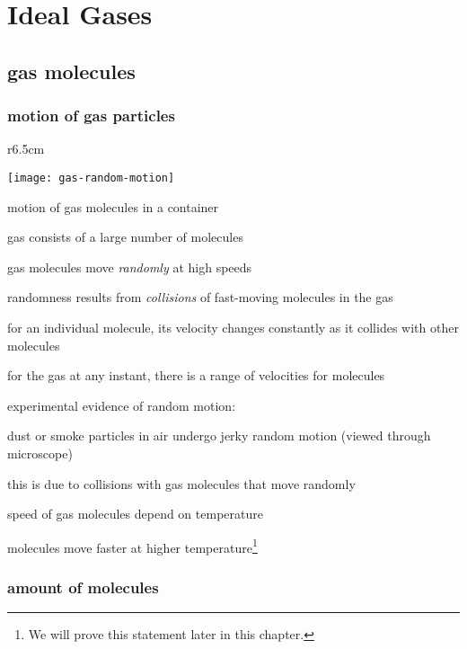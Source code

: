 \section{Ideal Gases}

\subsection{gas molecules}


\subsubsection{motion of gas particles} \label{s-gas-intro}

\begin{wrapfigure}{r}{6.5cm}
	\centering
	
	\vspace*{-20pt}
	
	\texttt{[image: gas-random-motion]}
		
	motion of gas molecules in a container
	
\end{wrapfigure}

gas consists of a large number of molecules

gas molecules move \emph{randomly} at high speeds

\cmt randomness results from \emph{collisions} of fast-moving molecules in the gas

for an individual molecule, its velocity changes constantly as it collides with other molecules

for the gas at any instant, there is a range of velocities for molecules

\cmt experimental evidence of random motion: 

dust or smoke particles in air undergo jerky random motion (viewed through microscope)

this is due to collisions with gas molecules that move randomly

\cmt speed of gas molecules depend on temperature

molecules move faster at higher temperature\footnote{We will prove this statement later in this chapter.}


\subsubsection{amount of molecules}

